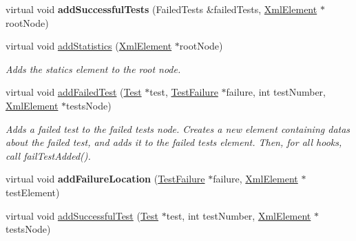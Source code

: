 \begin{DoxyCompactItemize}
\item 
\hypertarget{class_xml_outputter_a894ac39717c6b29d5d23c2f0a45fe54e}{virtual void {\bfseries add\+Successful\+Tests} (Failed\+Tests \&failed\+Tests, \hyperlink{class_xml_element}{Xml\+Element} $\ast$root\+Node)}\label{class_xml_outputter_a894ac39717c6b29d5d23c2f0a45fe54e}

\item 
virtual void \hyperlink{class_xml_outputter_a33d4ace9cb5746e9fd39c901b5632e84}{add\+Statistics} (\hyperlink{class_xml_element}{Xml\+Element} $\ast$root\+Node)
\begin{DoxyCompactList}\small\item\em Adds the statics element to the root node. \end{DoxyCompactList}\item 
\hypertarget{class_xml_outputter_a5002fa353d24724288987e704763def2}{virtual void \hyperlink{class_xml_outputter_a5002fa353d24724288987e704763def2}{add\+Failed\+Test} (\hyperlink{class_test}{Test} $\ast$test, \hyperlink{class_test_failure}{Test\+Failure} $\ast$failure, int test\+Number, \hyperlink{class_xml_element}{Xml\+Element} $\ast$tests\+Node)}\label{class_xml_outputter_a5002fa353d24724288987e704763def2}

\begin{DoxyCompactList}\small\item\em Adds a failed test to the failed tests node. Creates a new element containing datas about the failed test, and adds it to the failed tests element. Then, for all hooks, call fail\+Test\+Added(). \end{DoxyCompactList}\item 
\hypertarget{class_xml_outputter_ab1be06cdf873e87d6b21af72ea9a5b8b}{virtual void {\bfseries add\+Failure\+Location} (\hyperlink{class_test_failure}{Test\+Failure} $\ast$failure, \hyperlink{class_xml_element}{Xml\+Element} $\ast$test\+Element)}\label{class_xml_outputter_ab1be06cdf873e87d6b21af72ea9a5b8b}

\item 
\hypertarget{class_xml_outputter_a9f1b3768852b4dbf1a597c193a8e06a2}{virtual void \hyperlink{class_xml_outputter_a9f1b3768852b4dbf1a597c193a8e06a2}{add\+Successful\+Test} (\hyperlink{class_test}{Test} $\ast$test, int test\+Number, \hyperlink{class_xml_element}{Xml\+Element} $\ast$tests\+Node)}\label{class_xml_outputter_a9f1b3768852b4dbf1a597c193a8e06a2}


\end{DoxyCompactItemize}
